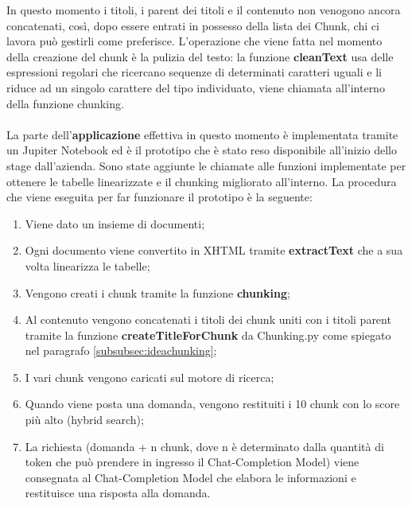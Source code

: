 \noindent In questo momento i titoli, i parent dei titoli e il contenuto non venogono ancora concatenati, così, dopo essere entrati in possesso della lista dei Chunk, chi ci lavora può gestirli come preferisce.
L'operazione che viene fatta nel momento della creazione del chunk è la pulizia del testo: la funzione \textbf{cleanText} usa delle espressioni regolari che ricercano sequenze di determinati caratteri uguali e li riduce ad un singolo carattere del tipo individuato, viene chiamata all'interno della funzione chunking.
\\\\
\noindent La parte dell'\textbf{applicazione} effettiva in questo momento è implementata tramite un Jupiter Notebook ed è il prototipo che  è stato reso disponibile all'inizio dello stage dall'azienda.
Sono state aggiunte le chiamate alle funzioni implementate per ottenere le tabelle linearizzate e il chunking migliorato all'interno.
La procedura che viene eseguita per far funzionare il prototipo è la seguente:
\begin{enumerate}
    \item Viene dato un insieme di documenti;
    \item Ogni documento viene convertito in XHTML tramite \textbf{extractText} che a sua volta linearizza le tabelle;
    \item Vengono creati i chunk tramite la funzione \textbf{chunking};
    \item Al contenuto vengono concatenati i titoli dei chunk uniti con i titoli parent tramite la funzione \textbf{createTitleForChunk} da Chunking.py come spiegato nel paragrafo \ref{subsubsec:ideachunking};
    \item I vari chunk vengono caricati sul motore di ricerca;
    \item Quando viene posta una domanda, vengono restituiti i 10 chunk con lo score più alto (hybrid search);
    \item La richiesta (domanda + n chunk, dove n è determinato dalla quantità di token che può prendere in ingresso il Chat-Completion Model) viene consegnata al Chat-Completion Model che elabora le informazioni e restituisce una risposta alla domanda. 
\end{enumerate}


